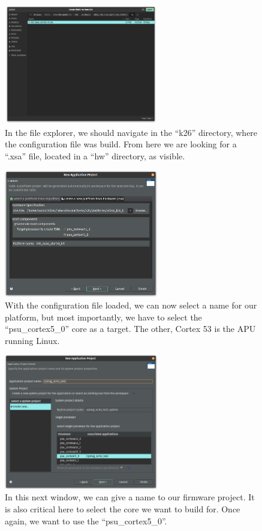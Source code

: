 \documentclass[10pt]{article}
\begin{document}
\begin{figure}[H]
  \centering
  \includegraphics[width=0.6\textwidth]{./img/vitis_new/project3}
  \caption{In the file explorer, we should navigate in the ``k26'' directory, where the configuration file was build.
    From here we are looking for a ``.xsa'' file, located in a ``hw'' directory, as visible.}
\end{figure}

\begin{figure}[H]
  \centering
  \includegraphics[width=0.6\textwidth]{./img/vitis_new/project4}
  \caption{With the configuration file loaded, we can now select a name for our platform, but most importantly, we have to select the ``psu\_cortex5\_0'' core
    as a target. The other, Cortex 53 is the APU running Linux.}
\end{figure}

\begin{figure}[H]
  \centering
  \includegraphics[width=0.6\textwidth]{./img/vitis_new/project5}
  \caption{In this next window, we can give a name to our firmware project. It is also critical here to select the core we want to build for.
    Once again, we want to use the ``psu\_cortex5\_0''.}
\end{figure}
\end{document}
